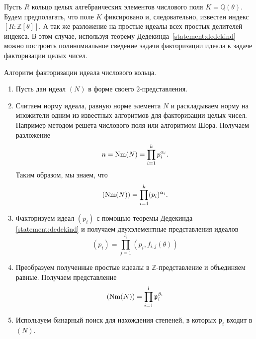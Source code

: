 \documentclass[_00_dissertation.tex]{subfiles}
\begin{document}
Пусть $R$ кольцо целых алгебраических элементов числового поля $K = \mathbb{Q}(\theta)$.
Будем предполагать, что поле $K$ фиксировано и, следовательно, известен индекс $[R: \mathbb{Z}[\theta]]$.
А так же разложение на простые идеалы всех простых делителей индекса.
В этом случае, используя теорему Дедекинда~\ref{statement:dedekind} можно построить полиномиальное сведение задачи факторизации идеала к задаче факторизации целых чисел.

\begin{algorithm}
    Алгоритм факторизации идеала числового кольца.

    \begin{enumerate}
        \item Пусть дан идеал $(N)$ в форме своего $2$-представления.
        
        \item Считаем норму идеала, равную норме элемента $N$ и раскладываем норму на множители одним из известных алгоритмов для факторизации целых чисел.
        Например методом решета числового поля или алгоритмом Шора.
        Получаем разложение
        \begin{equation*}
            n = \textrm{Nm}(N) = \prod_{i=1}^{k} p_i^{\alpha_i}.
        \end{equation*}
        Таким образом, мы знаем, что
        \begin{equation*}
            (\textrm{Nm}(N)) = \prod_{i=1}^{k} (p_i)^{\alpha_i}.
        \end{equation*}
    
        \item Факторизуем идеал $(p_i)$ с помощью теоремы Дедекинда \ref{statement:dedekind} и получаем двухэлементные представления идеалов
        \begin{equation*}
            (p_i) = \prod_{j=1}^{l_i} (p_i, f_{i, j}(\theta))
        \end{equation*}
    
        \item Преобразуем полученные простые идеалы в $\mathbb{Z}$-представление и объединяем равные.
        Получаем представление
        \begin{equation*}
            (\textrm{Nm}(N)) = \prod_{i=1}^{l} \mathfrak{p}_i^{\beta_i}
        \end{equation*}
    
        \item Используем бинарный поиск для нахождения степеней, в которых $\mathfrak{p}_i$ входит в $(N)$.
    \end{enumerate}
\end{algorithm}
\end{document}
